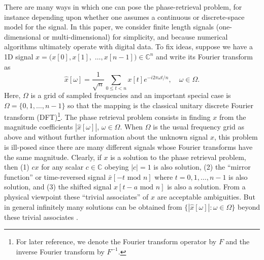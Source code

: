 \documentclass[11pt]{article}
\newcommand{\C}{\mathbb{C}}
\newcommand{\<}{\langle}
\renewcommand{\>}{\rangle}
\numberwithin{equation}{section}
\begin{document}
There are many ways in which one can pose the phase-retrieval problem,
for instance depending upon whether one assumes a continuous or
discrete-space model for the signal. In this paper, we consider finite
length signals (one-dimensional or multi-dimensional) for simplicity, 
and because numerical algorithms ultimately operate with digital data.
To fix ideas, suppose we have a 1D signal $x = (x[0], x[1],$ $\ldots,
x[n-1]) \in \C^n$ and write its Fourier transform as
\begin{equation}
  \label{eq:fourier}
  {\hat x}[\omega] = 
  \frac{1}{\sqrt{n}} \sum_{0 \le t < n} x[t] e^{-i 2\pi \omega t/n}, 
\quad \omega \in \Omega. 
\end{equation}
Here, $\Omega$ is a grid of sampled frequencies and an important
special case is $\Omega = \{0,1, \ldots, n-1\}$ so that the mapping is
the classical unitary discrete Fourier transform (DFT)\footnote{For
  later reference, we denote the Fourier transform operator by $F$ and
  the inverse Fourier transform by $F^{-1}$.}.  The phase retrieval
problem consists in finding $x$ from the magnitude coefficients
$|{\hat x}[\omega]|$, $\omega \in \Omega$.  When $\Omega$ is the usual
frequency grid as above and without further information about the
unknown signal $x$, this problem is ill-posed since there are many
different signals whose Fourier transforms have the same
magnitude. Clearly, if $x$ is a solution to the phase retrieval
problem, then (1) $c x$ for any scalar $c \in \C$ obeying $|c| = 1$ is
also solution, (2) the ``mirror function'' or time-reversed signal
$\bar{x}[-t \text{ mod } n]$ where $t = 0,1, \ldots, n-1$ is also
solution, and (3) the shifted signal $x[t - a \text{ mod } n]$ is also
a solution. From a physical viewpoint these ``trivial associates'' of
$x$ are acceptable ambiguities. But in general infinitely many
solutions can be obtained from $\{|\hat{x}[\omega]| : \omega \in
\Omega\}$ beyond these trivial associates \cite{San85}.

\end{document}
